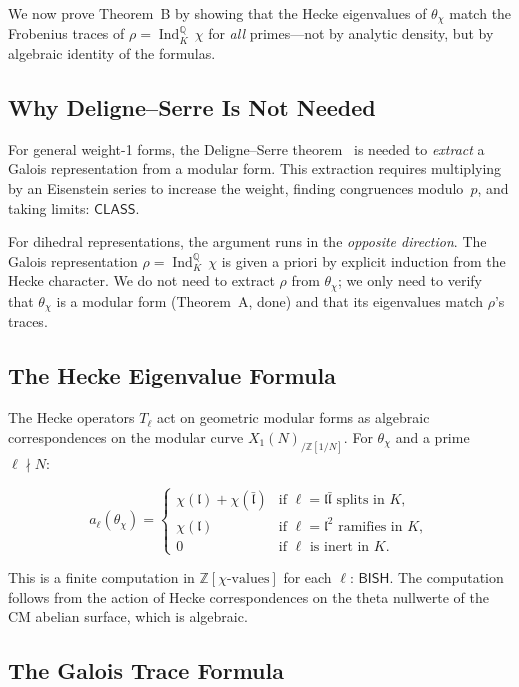 \documentclass[11pt,a4paper]{article}
\theoremstyle{plain}
\theoremstyle{definition}
\newcommand{\BISH}{\textsf{BISH}}
\newcommand{\CLASS}{\textsf{CLASS}}
\newcommand{\Z}{\mathbb{Z}}
\newcommand{\Q}{\mathbb{Q}}
\DeclareMathOperator{\Ind}{Ind}
\begin{document}
We now prove Theorem~B by showing that the Hecke eigenvalues of $\theta_\chi$ match the Frobenius traces of $\rho = \Ind_K^\Q\, \chi$ for \emph{all} primes---not by analytic density, but by algebraic identity of the formulas.

\subsection{Why Deligne--Serre Is Not Needed}

For general weight-1 forms, the Deligne--Serre theorem~\cite{deligne-serre74} is needed to \emph{extract} a Galois representation from a modular form. This extraction requires multiplying by an Eisenstein series to increase the weight, finding congruences modulo~$p$, and taking limits: $\CLASS$.

For dihedral representations, the argument runs in the \emph{opposite direction}. The Galois representation $\rho = \Ind_K^\Q\, \chi$ is given a priori by explicit induction from the Hecke character. We do not need to extract $\rho$ from $\theta_\chi$; we only need to verify that $\theta_\chi$ is a modular form (Theorem~A, done) and that its eigenvalues match $\rho$'s traces.

\subsection{The Hecke Eigenvalue Formula}

The Hecke operators $T_\ell$ act on geometric modular forms as algebraic correspondences on the modular curve $X_1(N)_{/\Z[1/N]}$. For $\theta_\chi$ and a prime $\ell \nmid N$:

\[
a_\ell(\theta_\chi) = \begin{cases}
\chi(\mathfrak{l}) + \chi(\bar{\mathfrak{l}}) & \text{if } \ell = \mathfrak{l}\bar{\mathfrak{l}} \text{ splits in } K, \\
\chi(\mathfrak{l}) & \text{if } \ell = \mathfrak{l}^2 \text{ ramifies in } K, \\
0 & \text{if } \ell \text{ is inert in } K.
\end{cases}
\]

This is a finite computation in $\Z[\chi\text{-values}]$ for each $\ell$: $\BISH$. The computation follows from the action of Hecke correspondences on the theta nullwerte of the CM abelian surface, which is algebraic.

\subsection{The Galois Trace Formula}
\end{document}
